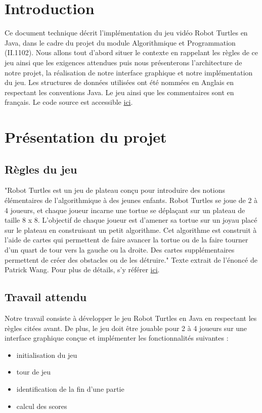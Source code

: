 \documentclass{article}
\begin{document}
\renewcommand{\contentsname}{Table des matières}
\tableofcontents
\cleardoublepage

\section{Introduction}
\indent Ce document technique décrit l'implémentation du jeu vidéo Robot Turtles en Java, dans le cadre du projet du module Algorithmique et Programmation (II.1102). Nous allons tout d'abord situer le contexte en rappelant les règles de ce jeu ainsi que les exigences attendues puis nous présenterons l'architecture de notre projet, la réalisation de notre interface graphique et notre implémentation du jeu.  Les structures de données utilisées ont été nommées en Anglais en respectant les conventions Java. Le jeu ainsi que les commentaires sont en français. Le code source est accessible \href{https://gitlab.com/Shinua/java_a1_turtle}{ici}.

\section{Présentation du projet}
	\subsection{Règles du jeu}
\indent "Robot Turtles est un jeu de plateau conçu pour introduire des notions élémentaires de l’algorithmique à des jeunes enfants. Robot Turtles se joue de 2 à 4 joueurs, et chaque joueur incarne une tortue se déplaçant sur un plateau de taille \(8\) x \(8\). L’objectif de chaque joueur est d’amener sa tortue sur un joyau placé sur le plateau en construisant un petit algorithme. Cet algorithme est construit à l’aide de cartes qui permettent de faire avancer la tortue ou de la faire tourner d’un quart de tour vers la gauche ou la droite. Des cartes supplémentaires permettent de créer des obstacles ou de les détruire."
Texte extrait de l'énoncé de Patrick Wang. Pour plus de détails, s'y référer \href{run:/Description_projet.pdf}{ici}.

	\subsection{Travail attendu}
\indent Notre travail consiste à développer le jeu Robot Turtles en Java en respectant les règles citées avant. De plus, le jeu doit 	être jouable pour 2 à 4 joueurs sur une interface graphique conçue et implémenter les fonctionnalités suivantes : 
	\begin{itemize}
  		\item initialisation du jeu
  		\item tour de jeu
  		\item identification de la fin d'une partie
  		\item calcul des scores
	\end{itemize}
\newpage
	
\end{document}
